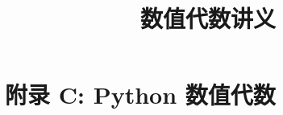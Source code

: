 \documentclass{book}
\begin{document}
\title{数值代数讲义}
\maketitle
\chapter{附录 C: Python 数值代数}


\cite{stein2003}


\end{document}
